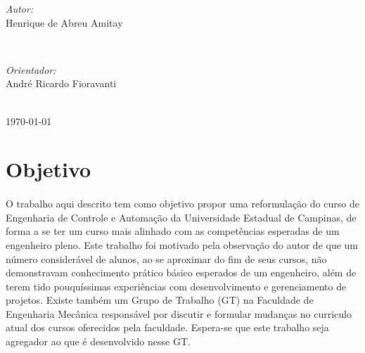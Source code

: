 \documentclass[12pt]{article} %
\begin{document}
\begin{titlepage}
\begin{minipage}{0.4\textwidth}
\begin{flushleft} \large
\emph{Autor:}\\
Henrique de Abreu {Amitay} %
\end{flushleft}
\end{minipage}
~
\begin{minipage}{0.4\textwidth}
\begin{flushleft} \large
\emph{Orientador:} \\
André Ricardo Fioravanti %
\end{flushleft}
\end{minipage}\\[4cm]

{\today}\\[3cm] %


\vfill %

\end{titlepage}

\tableofcontents
\pagebreak


\section{Objetivo}

\paragraph{}O trabalho aqui descrito tem como objetivo propor uma reformulação do curso de Engenharia de Controle e Automação da Universidade Estadual de Campinas, de forma a se ter um curso mais alinhado com as competências esperadas de um engenheiro pleno. Este trabalho foi motivado pela observação do autor de que um número considerável de alunos, ao se aproximar do fim de seus cursos, não demonstravam conhecimento prático básico esperados de um engenheiro, além de terem tido pouquíssimas experiências com desenvolvimento e gerenciamento de projetos. Existe também um Grupo de Trabalho (GT) na Faculdade de Engenharia Mecânica responsável por discutir e formular mudanças no curriculo atual dos cursos oferecidos pela faculdade. Espera-se que este trabalho seja agregador ao que é desenvolvido nesse GT.
\end{document}
